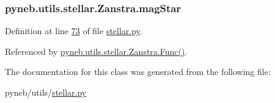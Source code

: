 \subsubsection[{mag\+Star}]{\setlength{\rightskip}{0pt plus 5cm}pyneb.\+utils.\+stellar.\+Zanstra.\+mag\+Star}\label{classpyneb_1_1utils_1_1stellar_1_1_zanstra_af635b1b8ca29b1b956b91e93f63fdf76}


Definition at line \hyperlink{stellar_8py_source_l00073}{73} of file \hyperlink{stellar_8py_source}{stellar.\+py}.



Referenced by \hyperlink{stellar_8py_source_l00089}{pyneb.\+utils.\+stellar.\+Zanstra.\+Func()}.



The documentation for this class was generated from the following file\+:\begin{DoxyCompactItemize}
\item 
pyneb/utils/\hyperlink{stellar_8py}{stellar.\+py}\end{DoxyCompactItemize}
